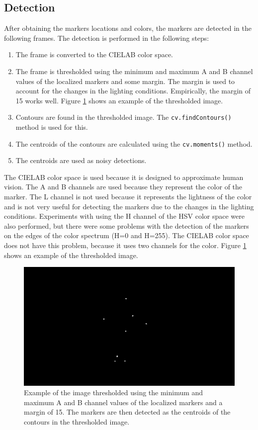 \subsection{Detection}
\label{detection}
After obtaining the markers locations and colors, the markers are detected in the following frames. The detection is performed in the following steps:
\begin{enumerate}
    \item The frame is converted to the CIELAB color space.
    \item The frame is thresholded using the minimum and maximum A and B channel values of the localized markers and some margin. The margin is used to account for the changes in the lighting conditions. Empirically, the margin of 15 works well. Figure \ref{fig:marker_detection} shows an example of the thresholded image.
    \item Contours are found in the thresholded image. The \texttt{cv.findContours()} method is used for this.
    \item The centroids of the contours are calculated using the \texttt{cv.moments()} method.
    \item The centroids are used as noisy detections.
\end{enumerate}

The CIELAB color space is used because it is designed to approximate human vision. The A and B channels are used because they represent the color of the marker. The L channel is not used because it represents the lightness of the color and is not very useful for detecting the markers due to the changes in the lighting conditions. Experiments with using the H channel of the HSV color space were also performed, but there were some problems with the detection of the markers on the edges of the color spectrum (H=0 and H=255). The CIELAB color space does not have this problem, because it uses two channels for the color. Figure \ref{fig:marker_detection} shows an example of the thresholded image.

\begin{figure}[htbp]
    \centering
    \includegraphics[width=\textwidth]{obrazky-figures/thresholded.png}
    \caption{Example of the image thresholded using the minimum and maximum A and B channel values of the localized markers and a margin of 15. The markers are then detected as the centroids of the contours in the thresholded image.}
    \label{fig:marker_detection}
\end{figure}

